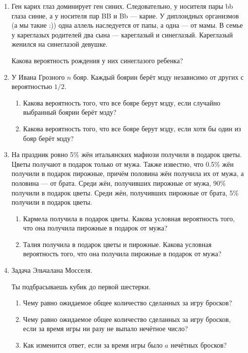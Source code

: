 \documentclass[12pt]{article}
\begin{document}
\begin{enumerate}[resume]
\item  Ген карих глаз доминирует ген синих. 
Следовательно, у носителя пары bb глаза синие, а у носителя пар BB и Bb — карие. 
У диплоидных организмов (а мы такие :)) одна аллель наследуется от папы, а одна — от мамы. 
В семье у кареглазых родителей два сына — кареглазый и синеглазый. 
Кареглазый женился на синеглазой девушке. 

Какова вероятность рождения у них синеглазого ребенка?

\item У Ивана Грозного $n$ бояр. 
Каждый боярин берёт мзду независимо от других с вероятностью $1/2$.

\begin{enumerate}
  \item Какова вероятность того, что все бояре берут мзду, если случайно выбранный боярин берёт мзду?
  \item Какова вероятность того, что все бояре берут мзду, если хотя бы один из бояр берёт мзду?
\end{enumerate}

\item На праздник ровно 5\% жён итальянских мафиози получили в подарок цветы.
Цветы получают в подарок только от мужа.
Также известно, что 0.5\% жён получили в подарок пирожные, причём половина жён получила их от мужа,
а половина — от брата.
Среди жён, получивших пирожные от мужа, 90\% получили в подарок цветы.
Среди жён, получивших пирожные от брата, 5\% получили в подарок цветы.

\begin{enumerate}
  \item Кармела получила в подарок цветы. Какова условная вероятность того, что она получила
      пирожные в подарок от мужа?

 \item Талия получила в подарок цветы и пирожные. Какова условная вероятность того, что она
получила пирожные в подарок от мужа?
\end{enumerate}

\item Задача Эльчалана Мосселя.

Ты подбрасываешь кубик до первой шестерки.

\begin{enumerate}
 \item Чему равно ожидаемое общее количество сделанных за игру бросков?
  \item Чему равно ожидаемое общее количество сделанных за игру бросков, если за время игры ни разу не выпало нечётное число?
  \item Как изменится ответ, если за время игры было $a$ нечётных бросков?
\end{enumerate}


\end{enumerate}
\end{document}
